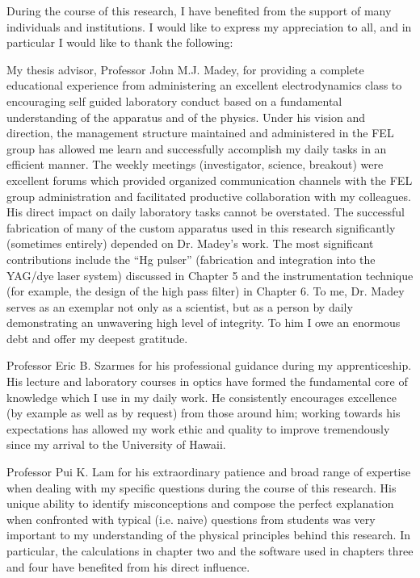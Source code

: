 \begin{acknowledgements}

During the course of this research, I have benefited from the support of many individuals and institutions. I would like to express my appreciation to all, and in particular I would like to thank the following:

My thesis advisor, Professor John M.J. Madey, for providing a complete educational experience from administering an excellent electrodynamics class to encouraging self guided laboratory conduct based on a fundamental understanding of the apparatus and of the physics. Under his vision and direction, the management structure maintained and administered in the FEL group has allowed me learn and successfully accomplish my daily tasks in an efficient manner. The weekly meetings (investigator, science, breakout) were excellent forums which provided organized communication channels with the FEL group administration and facilitated productive collaboration with my colleagues. His direct impact on daily laboratory tasks cannot be overstated. The successful fabrication of many of the custom apparatus used in this research significantly (sometimes entirely) depended on Dr. Madey's work. The most significant contributions include the ``Hg pulser'' (fabrication and integration into the YAG/dye laser system) discussed in Chapter 5 and the instrumentation technique (for example, the design of the high pass filter) in Chapter 6. To me, Dr. Madey serves as an exemplar not only as a scientist, but as a person by daily demonstrating an unwavering high level of integrity. To him I owe an enormous debt and offer my deepest gratitude.

Professor Eric B. Szarmes for his professional guidance during my apprenticeship. His lecture and laboratory courses in optics have formed the fundamental core of knowledge which I use in my daily work. He consistently encourages excellence (by example as well as by request) from those around him; working towards his expectations has allowed my work ethic and quality to improve tremendously since my arrival to the University of Hawaii.

Professor Pui K. Lam for his extraordinary patience and broad range of expertise when dealing with my specific questions during the course of this research. His unique ability to identify misconceptions and compose the perfect explanation when confronted with typical (i.e. naive) questions from students was very important to my understanding of the physical principles behind this research. In particular, the calculations in chapter two and the software used in chapters three and four have benefited from his direct influence.


\end{acknowledgements}
